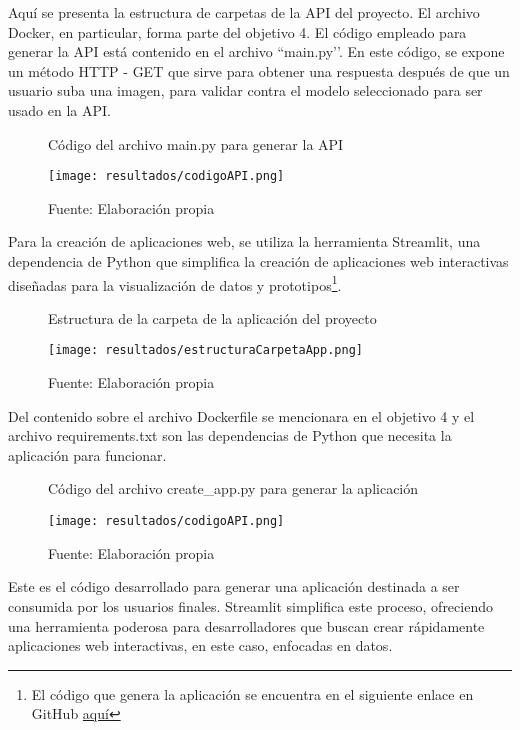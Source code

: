 Aquí se presenta la estructura de carpetas de la API del proyecto. El archivo Docker, en particular, forma parte del objetivo 4. El código empleado para generar la API está contenido en el archivo ``main.py’’. En este código, se expone un método HTTP - GET que sirve para obtener una respuesta después de que un usuario suba una imagen, para validar contra el modelo seleccionado para ser usado en la API.

\newpage

\begin{figure}[h]
\centering
\caption{Código del archivo main.py para generar la API}
\texttt{[image: resultados/codigoAPI.png]}
\caption*{\footnotesize Fuente: Elaboración propia}
\label{fig:figuraCodigoAPI}
\end{figure}

Para la creación de aplicaciones web, se utiliza la herramienta Streamlit, una dependencia de Python que simplifica la creación de aplicaciones web interactivas diseñadas para la visualización de datos y prototipos\footnote{El código que genera la aplicación se encuentra en el siguiente enlace en GitHub \href{https://github.com/juferoto/mlops_project/tree/master/application/src/webapp}{aquí}}.

\newpage

\begin{figure}[h]
\centering
\caption{Estructura de la carpeta de la aplicación del proyecto}
\texttt{[image: resultados/estructuraCarpetaApp.png]}
\caption*{\footnotesize Fuente: Elaboración propia}
\label{fig:figuraEstructuraCarpetaApp}
\end{figure}

Del contenido sobre el archivo Dockerfile se mencionara en el objetivo 4 y el archivo requirements.txt son las dependencias de Python que necesita la aplicación para funcionar.

\newpage

\begin{figure}[h]
\centering
\caption{Código del archivo create\_app.py para generar la aplicación}
\texttt{[image: resultados/codigoAPI.png]}
\caption*{\footnotesize Fuente: Elaboración propia}
\label{fig:figuraCodigoAPI}
\end{figure}

Este es el código desarrollado para generar una aplicación destinada a ser consumida por los usuarios finales. Streamlit simplifica este proceso, ofreciendo una herramienta poderosa para desarrolladores que buscan crear rápidamente aplicaciones web interactivas, en este caso, enfocadas en datos.

